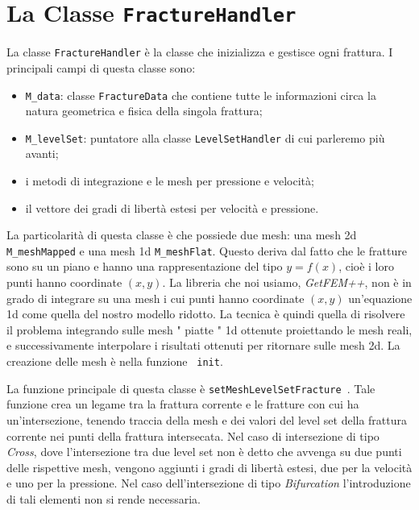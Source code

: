\section{La Classe \texttt{FractureHandler}}

La classe  \texttt{FractureHandler} è la classe che inizializza e gestisce ogni frattura. I principali campi di questa classe sono:
\begin{itemize}
\item \texttt{M\_data}: classe \texttt{FractureData} che contiene tutte le informazioni circa la natura geometrica e fisica della singola frattura;
\item \texttt{M\_levelSet}: puntatore alla classe \texttt{LevelSetHandler} di cui parleremo più avanti;
\item i metodi di integrazione e le mesh per pressione e velocità;
\item il vettore dei gradi di libertà estesi per velocità e pressione.
\end{itemize}

La particolarità di questa classe è che possiede due mesh: una mesh 2d \texttt{M\_meshMapped} e una mesh 1d \texttt{M\_meshFlat}. Questo deriva dal fatto che le fratture sono su un piano e hanno una rappresentazione del tipo $y=f(x)$, cioè i loro punti hanno coordinate $(x,y)$. La libreria che noi usiamo, \textit{GetFEM++}, non è in grado di integrare su una mesh i cui punti hanno coordinate $(x,y)$ un'equazione 1d come quella del nostro modello ridotto. La tecnica è quindi quella di risolvere il problema integrando sulle mesh " piatte " 1d ottenute proiettando le mesh reali, e successivamente interpolare i risultati ottenuti per ritornare sulle mesh 2d. La creazione delle mesh è nella funzione \texttt{ init}.
\par La funzione principale di questa classe è  \texttt{setMeshLevelSetFracture }.
Tale funzione crea un legame tra la frattura corrente e le fratture con cui ha un'intersezione, tenendo traccia della mesh e dei valori del level set della frattura corrente nei punti della frattura intersecata. Nel caso di intersezione di tipo \textit{Cross}, dove l'intersezione tra due level set non è detto che avvenga su due punti delle rispettive mesh, vengono aggiunti i gradi di libertà estesi, due per la velocità e uno per la pressione. Nel caso dell'intersezione di tipo \textit{Bifurcation} l'introduzione di tali elementi non si rende necessaria.


